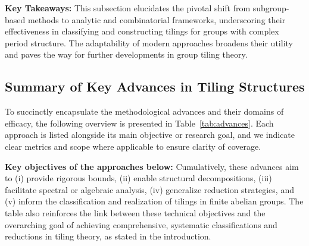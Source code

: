 \documentclass[sigconf]{acmart}
\begin{document}
\textbf{Key Takeaways:}
This subsection elucidates the pivotal shift from subgroup-based methods to analytic and combinatorial frameworks, underscoring their effectiveness in classifying and constructing tilings for groups with complex period structure. The adaptability of modern approaches broadens their utility and paves the way for further developments in group tiling theory.

\subsection{Summary of Key Advances in Tiling Structures}

To succinctly encapsulate the methodological advances and their domains of efficacy, the following overview is presented in Table~\ref{tab:advances}. Each approach is listed alongside its main objective or research goal, and we indicate clear metrics and scope where applicable to ensure clarity of coverage.

\vspace{0.5em}
\noindent
\textbf{Key objectives of the approaches below:}
Cumulatively, these advances aim to (i) provide rigorous bounds, (ii) enable structural decompositions, (iii) facilitate spectral or algebraic analysis, (iv) generalize reduction strategies, and (v) inform the classification and realization of tilings in finite abelian groups. The table also reinforces the link between these technical objectives and the overarching goal of achieving comprehensive, systematic classifications and reductions in tiling theory, as stated in the introduction.
\end{document}
